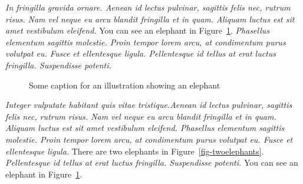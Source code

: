 \documentclass[
  10pt,
  a4paper,
]{scrbook}
\let\oldemph\emph
\renewcommand\emph[1]{\oldemph{\color{gray}#1}} %
\begin{document}
\emph{In fringilla gravida ornare. Aenean id lectus pulvinar, sagittis
felis nec, rutrum risus. Nam vel neque eu arcu blandit fringilla et in
quam. Aliquam luctus est sit amet vestibulum eleifend.} You can see an
elephant in Figure~\ref{fig-elephant}. \emph{Phasellus elementum
sagittis molestie. Proin tempor lorem arcu, at condimentum purus
volutpat eu. Fusce et ellentesque ligula. Pellentesque id tellus at erat
luctus fringilla. Suspendisse potenti.}

\begin{figure}


\caption{\label{fig-elephant}Some caption for an illustration showing an
elephant}

\end{figure}%

\emph{Integer vulputate habitant quis vitae tristique.Aenean id lectus
pulvinar, sagittis felis nec, rutrum risus. Nam vel neque eu arcu
blandit fringilla et in quam. Aliquam luctus est sit amet vestibulum
eleifend. Phasellus elementum sagittis molestie. Proin tempor lorem
arcu, at condimentum purus volutpat eu. Fusce et ellentesque ligula.}
There are two elephants in Figure~\ref{fig-twoelephants}.
\emph{Pellentesque id tellus at erat luctus fringilla. Suspendisse
potenti.} You can see an elephant in Figure~\ref{fig-elephant}.
\end{document}
